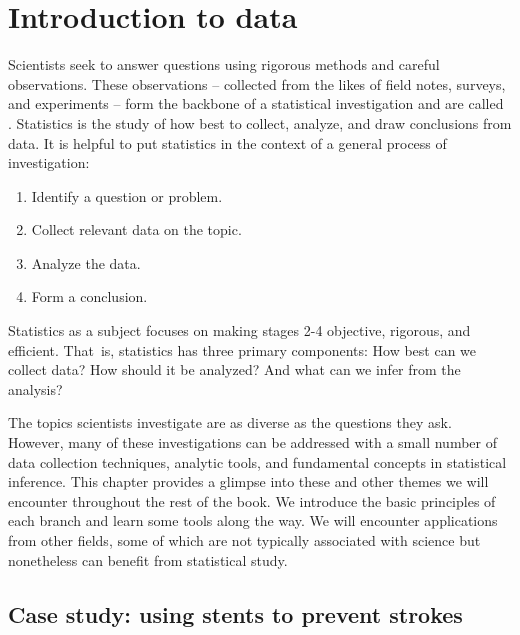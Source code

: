 \chapter{Introduction to data}
\label{introductionToData}


Scientists seek to answer questions using rigorous methods and careful observations. These observations -- collected from the likes of field notes, surveys, and experiments -- form the backbone of a statistical investigation and are called . Statistics is the study of how best to collect, analyze, and draw conclusions from data. It is helpful to put statistics in the context of a general process of investigation:
\begin{enumerate}
\setlength{\itemsep}{0mm}
\item Identify a question or problem.
\item Collect relevant data on the topic.
\item Analyze the data.
\item Form a conclusion.
\end{enumerate}
Statistics as a subject focuses on making stages 2-4 objective, rigorous, and efficient. That~is, statistics has three primary components: How best can we collect data? How should it be analyzed? And what can we infer from the analysis?

The topics scientists investigate are as diverse as the questions they ask. However, many of these investigations can be addressed with a small number of data collection techniques, analytic tools, and fundamental concepts in statistical inference. This chapter provides a glimpse into these and other themes we will encounter throughout the rest of the book. We introduce the basic principles of each branch and learn some tools along the way. We will encounter applications from other fields, some of which are not typically associated with science but nonetheless can benefit from statistical study.

\section[Case study: using stents to prevent strokes]{Case study: using stents to prevent strokes }
\label{basicExampleOfStentsAndStrokes}

